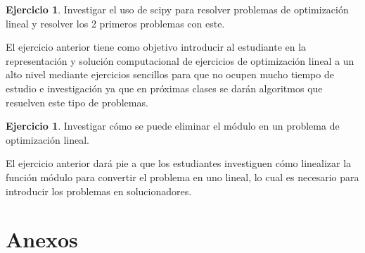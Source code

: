 \documentclass[a4paper,10pt,twocolumn]{article}
\theoremstyle{theorem}
\theoremstyle{definition}
\newtheorem{ejer}[thm]{Ejercicio}
\theoremstyle{remark}
\begin{document}
%
%
%
\begin{ejer}
	Investigar el uso de scipy para resolver problemas de optimización lineal y resolver los 2 primeros problemas con este.
\end{ejer}
El ejercicio anterior tiene como objetivo introducir al estudiante en la representación y solución computacional de ejercicios de optimización lineal a un alto nivel mediante ejercicios sencillos para que no ocupen mucho tiempo de estudio e investigación ya que en próximas clases se darán algoritmos que resuelven este tipo de problemas.

\begin{ejer}
	Investigar cómo se puede eliminar el módulo en un problema de optimización lineal. 
\end{ejer}
El ejercicio anterior dará pie a que los estudiantes investiguen cómo linealizar la función módulo para convertir el problema en uno lineal, lo cual es necesario para introducir los problemas en solucionadores.

\newpage

\section{Anexos}
\end{document}
